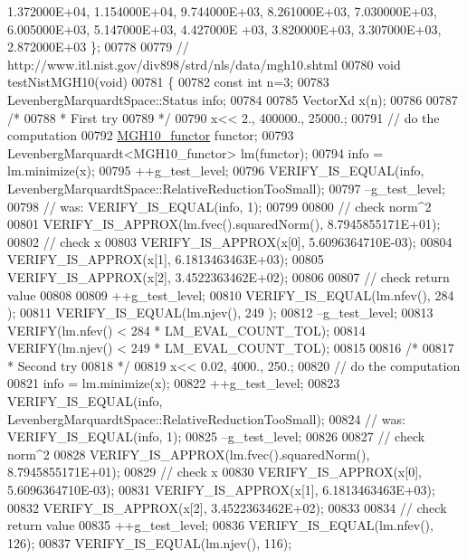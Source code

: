 \begin{DoxyCode}
       1.372000E+04, 1.154000E+04, 9.744000E+03, 8.261000E+03, 7.030000E+03, 6.005000E+03, 5.147000E+03, 4.427000E
      +03, 3.820000E+03, 3.307000E+03, 2.872000E+03 \};
00778 
00779 \textcolor{comment}{// http://www.itl.nist.gov/div898/strd/nls/data/mgh10.shtml}
00780 \textcolor{keywordtype}{void} testNistMGH10(\textcolor{keywordtype}{void})
00781 \{
00782   \textcolor{keyword}{const} \textcolor{keywordtype}{int} n=3;
00783   LevenbergMarquardtSpace::Status info;
00784 
00785   VectorXd x(n);
00786 
00787   \textcolor{comment}{/*}
00788 \textcolor{comment}{   * First try}
00789 \textcolor{comment}{   */}
00790   x<< 2., 400000., 25000.;
00791   \textcolor{comment}{// do the computation}
00792   \hyperlink{struct_m_g_h10__functor}{MGH10\_functor} functor;
00793   LevenbergMarquardt<MGH10\_functor> lm(functor);
00794   info = lm.minimize(x);
00795   ++g\_test\_level;
00796   VERIFY\_IS\_EQUAL(info, LevenbergMarquardtSpace::RelativeReductionTooSmall);
00797   --g\_test\_level;
00798   \textcolor{comment}{// was: VERIFY\_IS\_EQUAL(info, 1);}
00799 
00800   \textcolor{comment}{// check norm^2}
00801   VERIFY\_IS\_APPROX(lm.fvec().squaredNorm(), 8.7945855171E+01);
00802   \textcolor{comment}{// check x}
00803   VERIFY\_IS\_APPROX(x[0], 5.6096364710E-03);
00804   VERIFY\_IS\_APPROX(x[1], 6.1813463463E+03);
00805   VERIFY\_IS\_APPROX(x[2], 3.4522363462E+02);
00806   
00807   \textcolor{comment}{// check return value}
00808 
00809   ++g\_test\_level;
00810   VERIFY\_IS\_EQUAL(lm.nfev(), 284 );
00811   VERIFY\_IS\_EQUAL(lm.njev(), 249 );
00812   --g\_test\_level;
00813   VERIFY(lm.nfev() < 284 * LM\_EVAL\_COUNT\_TOL);
00814   VERIFY(lm.njev() < 249 * LM\_EVAL\_COUNT\_TOL);
00815 
00816   \textcolor{comment}{/*}
00817 \textcolor{comment}{   * Second try}
00818 \textcolor{comment}{   */}
00819   x<< 0.02, 4000., 250.;
00820   \textcolor{comment}{// do the computation}
00821   info = lm.minimize(x);
00822   ++g\_test\_level;
00823   VERIFY\_IS\_EQUAL(info, LevenbergMarquardtSpace::RelativeReductionTooSmall);
00824   \textcolor{comment}{// was: VERIFY\_IS\_EQUAL(info, 1);}
00825   --g\_test\_level;
00826 
00827   \textcolor{comment}{// check norm^2}
00828   VERIFY\_IS\_APPROX(lm.fvec().squaredNorm(), 8.7945855171E+01);
00829   \textcolor{comment}{// check x}
00830   VERIFY\_IS\_APPROX(x[0], 5.6096364710E-03);
00831   VERIFY\_IS\_APPROX(x[1], 6.1813463463E+03);
00832   VERIFY\_IS\_APPROX(x[2], 3.4522363462E+02);
00833   
00834   \textcolor{comment}{// check return value}
00835   ++g\_test\_level;
00836   VERIFY\_IS\_EQUAL(lm.nfev(), 126);
00837   VERIFY\_IS\_EQUAL(lm.njev(), 116);

\end{DoxyCode}
